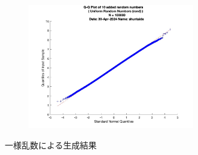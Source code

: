 \begin{figure}
\begin{subfigure}{0.48\linewidth}
		\label{fig:cl-uniform-added}
	\end{subfigure}
	\begin{subfigure}{0.48\linewidth}
		\centering
		\includegraphics[width=0.8\textwidth]{src/figures/cl-uniform/cl_added_rand_qqpl_N=100000.jpg}
		\label{fig:cl-uniform-added-qqpl}
	\end{subfigure}
	\caption{一様乱数による生成結果}\label{fig:cl-uniform-random}
\end{figure}
